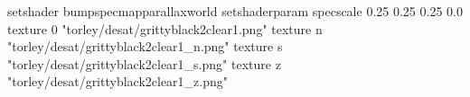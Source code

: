 setshader bumpspecmapparallaxworld
setshaderparam specscale 0.25 0.25 0.25 0.0
texture 0 "torley/desat/grittyblack2clear1.png"
texture n "torley/desat/grittyblack2clear1_n.png"
texture s "torley/desat/grittyblack2clear1_s.png"
texture z "torley/desat/grittyblack2clear1_z.png"

